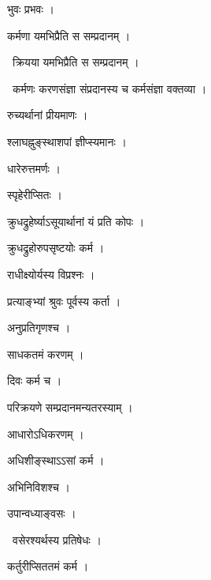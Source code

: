 \documentclass[10pt, openany, oneside]{book}
\begin{document}
\noindent भुवः प्रभवः ।

\noindent कर्मणा यमभिप्रैति स सम्प्रदानम् ।

\par\noindent\hspace{1.5em}{\vps वा॰}~{\qt क्रियया यमभिप्रैति स सम्प्रदानम् ।}

\par\noindent\hspace{1.5em}{\vps वा॰}~{\qt कर्मणः करणसंज्ञा संप्रदानस्य च कर्मसंज्ञा वक्तव्या ।}

\noindent रुच्यर्थानां प्रीयमाणः ।

\noindent श्लाघह्नुङ्स्थाशपां ज्ञीप्स्यमानः ।

\noindent धारेरुत्तमर्णः ।

\noindent स्पृहेरीप्सितः ।

\noindent क्रुधद्रुहेर्ष्याऽसूयार्थानां यं प्रति कोपः ।

\noindent क्रुधद्रुहोरुपसृष्टयोः कर्म ।

\noindent राधीक्ष्योर्यस्य विप्रश्नः ।

\noindent प्रत्याङ्भ्यां श्रुवः पूर्वस्य कर्ता ।

\noindent अनुप्रतिगृणश्च ।

\noindent साधकतमं करणम् ।

\noindent दिवः कर्म च ।

\noindent परिक्रयणे सम्प्रदानमन्यतरस्याम् ।

\noindent आधारोऽधिकरणम् ।

\noindent अधिशीङ्स्थाऽऽसां कर्म ।

\noindent अभिनिविशश्च ।

\noindent उपान्वध्याङ्वसः ।

\par\noindent\hspace{1.5em}{\vps वा॰}~{\qt वसेरश्यर्थस्य प्रतिषेधः ।}

\noindent कर्तुरीप्सिततमं कर्म ।
\end{document}
